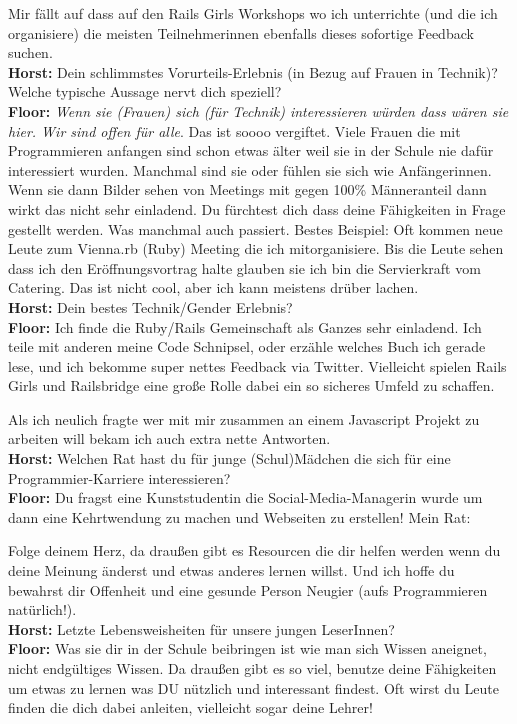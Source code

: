 Mir fällt auf dass auf den Rails Girls Workshops wo ich unterrichte (und die ich organisiere) die meisten Teilnehmerinnen ebenfalls dieses sofortige Feedback suchen. \\
\textbf{Horst:} Dein schlimmstes Vorurteils-Erlebnis (in Bezug auf Frauen in Technik)? Welche typische Aussage nervt dich speziell? \\
\textbf{Floor:} \textit{Wenn sie (Frauen) sich (für Technik) interessieren würden dass wären sie hier. Wir sind offen für alle}. Das ist soooo vergiftet. Viele Frauen die mit Programmieren anfangen sind schon etwas älter weil sie in der Schule nie dafür interessiert wurden. Manchmal sind sie oder fühlen sie sich wie Anfängerinnen. Wenn sie dann Bilder sehen von Meetings mit gegen 100\% Männeranteil dann wirkt das nicht sehr einladend. Du fürchtest dich dass deine Fähigkeiten in Frage gestellt werden. Was manchmal auch passiert. Bestes Beispiel: Oft kommen neue Leute zum Vienna.rb (Ruby) Meeting die ich mitorganisiere. Bis die Leute sehen dass ich den Eröffnungsvortrag halte glauben sie ich bin die Servierkraft vom Catering. Das ist nicht cool, aber ich kann meistens drüber lachen. \\
\textbf{Horst:}  Dein bestes Technik/Gender Erlebnis? \\
\textbf{Floor:} Ich finde die Ruby/Rails Gemeinschaft als Ganzes sehr einladend. Ich teile mit anderen meine Code Schnipsel, oder erzähle welches Buch ich gerade lese, und ich bekomme super nettes Feedback via Twitter. Vielleicht spielen Rails Girls und Railsbridge eine große Rolle dabei ein so sicheres Umfeld zu schaffen.

Als ich neulich fragte wer mit mir zusammen an einem Javascript Projekt zu arbeiten will bekam ich auch extra nette Antworten. \\
\textbf{Horst:} Welchen Rat hast du für junge (Schul)Mädchen die sich für eine Programmier-Karriere interessieren? \\
\textbf{Floor:} Du fragst eine Kunststudentin die Social-Media-Managerin wurde um dann eine Kehrtwendung zu machen und Webseiten zu erstellen! Mein Rat: 

Folge deinem Herz, da draußen gibt es Resourcen die dir helfen werden wenn du deine Meinung änderst und etwas anderes lernen willst. Und ich hoffe du bewahrst dir Offenheit und eine gesunde Person Neugier (aufs Programmieren natürlich!). \\
\textbf{Horst:} Letzte Lebensweisheiten für unsere jungen LeserInnen? \\
\textbf{Floor:} Was sie dir in der Schule beibringen ist wie man sich Wissen aneignet, nicht endgültiges Wissen. Da draußen gibt es so viel, benutze deine Fähigkeiten um etwas zu lernen was DU nützlich und interessant findest. Oft wirst du Leute finden die dich dabei anleiten, vielleicht sogar deine Lehrer!

